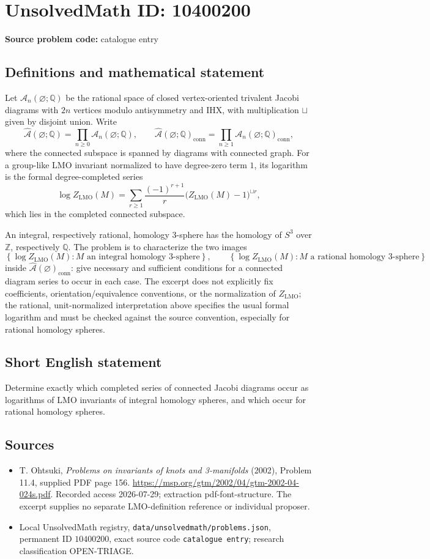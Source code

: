\documentclass[11pt]{article}
\newcommand{\Z}{\mathbb{Z}}
\newcommand{\Q}{\mathbb{Q}}
\begin{document}
\section*{UnsolvedMath ID: 10400200}
\textbf{Source problem code:} catalogue entry
\subsection{Definitions and mathematical statement}
Let \(\mathcal A_n(\varnothing;\Q)\) be the rational space of closed vertex-oriented trivalent Jacobi diagrams with \(2n\) vertices modulo antisymmetry and IHX, with multiplication \(\sqcup\) given by disjoint union. Write
\[
 \widehat{\mathcal A}(\varnothing;\Q)
   =\prod_{n\geq0}\mathcal A_n(\varnothing;\Q),\qquad
 \widehat{\mathcal A}(\varnothing;\Q)_{\mathrm{conn}}
   =\prod_{n\geq1}\mathcal A_n(\varnothing;\Q)_{\mathrm{conn}},
\]
where the connected subspace is spanned by diagrams with connected graph. For a group-like LMO invariant normalized to have degree-zero term \(1\), its logarithm is the formal degree-completed series
\[
 \log Z_{\mathrm{LMO}}(M)
 =\sum_{r\geq1}\frac{(-1)^{r+1}}r
       \bigl(Z_{\mathrm{LMO}}(M)-1\bigr)^{\sqcup r},
\]
which lies in the completed connected subspace.

An integral, respectively rational, homology \(3\)-sphere has the homology of \(S^3\) over \(\Z\), respectively \(\Q\). The problem is to characterize the two images
\[
 \left\{\log Z_{\mathrm{LMO}}(M):
          M\text{ an integral homology }3\text{-sphere}\right\},\qquad
 \left\{\log Z_{\mathrm{LMO}}(M):
          M\text{ a rational homology }3\text{-sphere}\right\}
\]
inside \(\widehat{\mathcal A}(\varnothing)_{\mathrm{conn}}\): give necessary and sufficient conditions for a connected diagram series to occur in each case. The excerpt does not explicitly fix coefficients, orientation/equivalence conventions, or the normalization of \(Z_{\mathrm{LMO}}\); the rational, unit-normalized interpretation above specifies the usual formal logarithm and must be checked against the source convention, especially for rational homology spheres.
\subsection{Short English statement}
Determine exactly which completed series of connected Jacobi diagrams occur as logarithms of LMO invariants of integral homology spheres, and which occur for rational homology spheres.
\subsection{Sources}
\begin{itemize}
\item T. Ohtsuki, \emph{Problems on invariants of knots and 3-manifolds} (2002), Problem 11.4, supplied PDF page 156. \url{https://msp.org/gtm/2002/04/gtm-2002-04-024s.pdf}. Recorded access 2026-07-29; extraction pdf-font-structure. The excerpt supplies no separate LMO-definition reference or individual proposer.
\item Local UnsolvedMath registry, \texttt{data/unsolvedmath/problems.json}, permanent ID \(10400200\), exact source code \texttt{catalogue entry}; research classification OPEN-TRIAGE.
\end{itemize}
\end{document}
